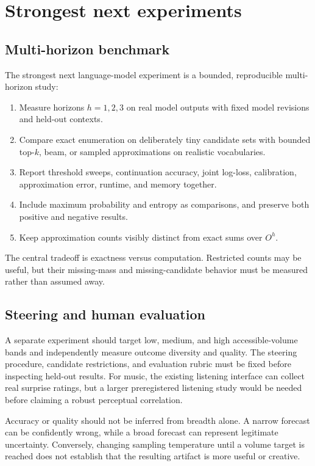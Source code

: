 \documentclass[11pt,a4paper]{article}
\begin{document}
\section{Strongest next experiments}
\subsection{Multi-horizon benchmark}
The strongest next language-model experiment is a bounded, reproducible multi-horizon study:
\begin{enumerate}[nosep]
  \item Measure horizons $h=1,2,3$ on real model outputs with fixed model revisions and held-out contexts.
  \item Compare exact enumeration on deliberately tiny candidate sets with bounded top-$k$, beam, or sampled approximations on realistic vocabularies.
  \item Report threshold sweeps, continuation accuracy, joint log-loss, calibration, approximation error, runtime, and memory together.
  \item Include maximum probability and entropy as comparisons, and preserve both positive and negative results.
  \item Keep approximation counts visibly distinct from exact sums over $O^h$.
\end{enumerate}
The central tradeoff is exactness versus computation. Restricted counts may be useful, but their missing-mass and missing-candidate behavior must be measured rather than assumed away.

\subsection{Steering and human evaluation}
A separate experiment should target low, medium, and high accessible-volume bands and independently measure outcome diversity and quality. The steering procedure, candidate restrictions, and evaluation rubric must be fixed before inspecting held-out results. For music, the existing listening interface can collect real surprise ratings, but a larger preregistered listening study would be needed before claiming a robust perceptual correlation.

Accuracy or quality should not be inferred from breadth alone. A narrow forecast can be confidently wrong, while a broad forecast can represent legitimate uncertainty. Conversely, changing sampling temperature until a volume target is reached does not establish that the resulting artifact is more useful or creative.
\end{document}
